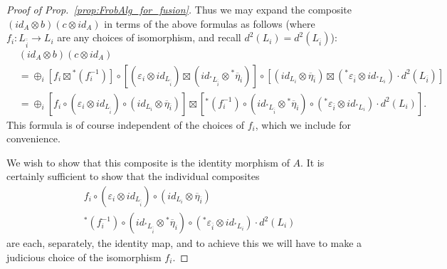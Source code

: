 \documentclass{amsart}
\begin{document}
\begin{proof}[Proof of Prop.~\ref{prop:FrobAlg_for_fusion}]
Thus we may expand the composite $(id_A \otimes b) (c \otimes id_A)$ in terms of the above formulas as follows (where $f_i: L_{\overline{\overline{i}}} \to L_i$ are any choices of isomorphism, and recall $d^2(L_i) = d^2(L_{\overline{i}})$):
\begin{align*}
	&(id_A \otimes b) (c \otimes id_A) \\
	 &= \oplus_i   [f_i \boxtimes {}^*(f_i^{-1})] \circ [ (\varepsilon_i \otimes id_{L_{\overline{\overline{i}}}}) \boxtimes (id_{{}^* L_{\overline{\overline{i}}}} \otimes {}^* \overline{\eta}_i)] \circ [(id_{L_i} \otimes \overline{\eta}_{\overline{i}} ) \boxtimes ( {}^*\varepsilon_{\overline{i}} \otimes id_{{}^*L_i} ) \cdot d^2(L_{\overline{i}})] \\
	&= \oplus_i [f_i \circ (\varepsilon_i \otimes id_{L_{\overline{\overline{i}}}}) \circ (id_{L_i} \otimes \overline{\eta}_{\overline{i}} ) ] \boxtimes [ {}^*(f_i^{-1}) \circ (id_{{}^* L_{\overline{\overline{i}}}} \otimes {}^* \overline{\eta}_i) \circ ( {}^*\varepsilon_{\overline{i}} \otimes id_{{}^*L_i} )  \cdot d^2(L_i)].
\end{align*}
This formula is of course independent of the choices of $f_i$, which we include for convenience. 

We wish to show that this composite is the identity morphism of $A$. It is certainly sufficient to show that the individual composites
\begin{align}
	&  f_i \circ (\varepsilon_i \otimes id_{L_{\overline{\overline{i}}}}) \circ (id_{L_i} \otimes \overline{\eta}_{\overline{i}} )  \label{eqn:1} \\
	& {}^*(f_i^{-1}) \circ (id_{{}^* L_{\overline{\overline{i}}}} \otimes {}^* \overline{\eta}_i) \circ ( {}^*\varepsilon_{\overline{i}} \otimes id_{{}^*L_i} )   \cdot d^2(L_i) \label{eqn:2}
\end{align}
are each, separately, the identity map, and to achieve this we will have to make a judicious choice of the isomorphism $f_i$. 


\end{proof}
\end{document}

